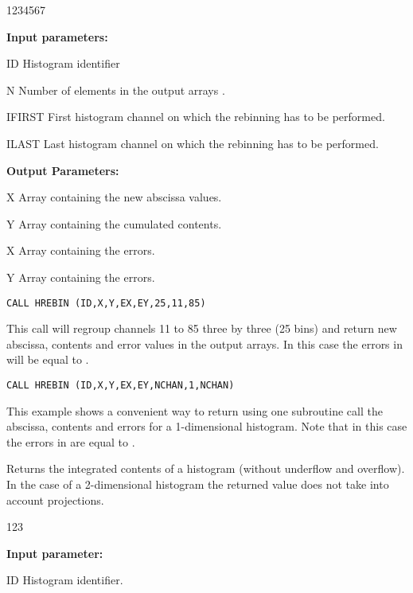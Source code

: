 \begin{DLtt}{1234567}
\item[{\rm\bf Input parameters:}]
\item[ID] Histogram identifier
\item[N] Number of elements in the output arrays .
\item[IFIRST] First histogram channel on which the rebinning has
to be performed.
\item[ILAST] Last histogram channel on which the rebinning has
to be performed.
\item[{\rm\bf Output Parameters:}]
\item[X] Array containing the new abscissa values.
\item[Y] Array containing the cumulated contents.
\item[X] Array containing the  errors.
\item[Y] Array containing the  errors.
\end{DLtt}
 
\Example
\begin{verbatim}
CALL HREBIN (ID,X,Y,EX,EY,25,11,85)
\end{verbatim}
This call will regroup channels 11 to 85 three by three (25 bins)
and return new abscissa, contents and error values in the output arrays.
In this case the errors in  will be equal to .
 
\begin{verbatim}
CALL HREBIN (ID,X,Y,EX,EY,NCHAN,1,NCHAN)
\end{verbatim}
This example shows a convenient way to return using one
subroutine call the abscissa, contents and errors for a 1-dimensional
histogram. Note that
in this case the errors in  are equal to .
\newpage
 
\newpage

\label{HINTCONT}
 
 
\Action
Returns the integrated contents of a histogram
(without underflow and overflow).
In the case of a 2-dimensional histogram the returned
value does not take into account projections.
 
\begin{DLtt}{123}
\item[{\rm\bf Input parameter:}]
\item[ID] Histogram identifier.
\end{DLtt}


